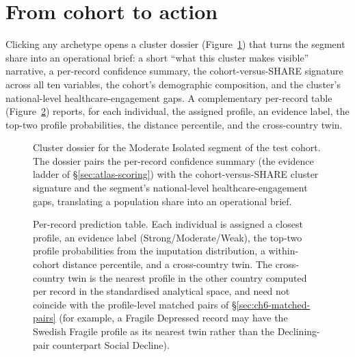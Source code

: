 \section{From cohort to action}
\label{sec:atlas-action}

 Clicking any archetype opens a cluster dossier (Figure~\ref{fig:atlas-drilldown}) that turns the segment share into an operational brief: a short ``what this cluster makes visible'' narrative, a per-record confidence summary, the cohort-versus-SHARE signature across all ten variables, the cohort's demographic composition, and the cluster's national-level healthcare-engagement gaps. A complementary per-record table (Figure~\ref{fig:atlas-perrow}) reports, for each individual, the assigned profile, an evidence label, the top-two profile probabilities, the distance percentile, and the cross-country twin.

\begin{figure}[H]
  \centering
  \caption[Italian Silver Atlas, cluster dossier]{Cluster dossier for the Moderate Isolated segment of the test cohort. The dossier pairs the per-record confidence summary (the evidence ladder of \S\ref{sec:atlas-scoring}) with the cohort-versus-SHARE cluster signature and the segment's national-level healthcare-engagement gaps, translating a population share into an operational brief.}
  \label{fig:atlas-drilldown}
\end{figure}

\begin{figure}[H]
  \centering
  \caption[Italian Silver Atlas, per-record prediction]{Per-record prediction table. Each individual is assigned a closest profile, an evidence label (Strong/Moderate/Weak), the top-two profile probabilities from the imputation distribution, a within-cohort distance percentile, and a cross-country twin. The cross-country twin is the nearest profile in the other country computed per record in the standardised analytical space, and need not coincide with the profile-level matched pairs of \S\ref{sec:ch6-matched-pairs} (for example, a Fragile Depressed record may have the Swedish Fragile profile as its nearest twin rather than the Declining-pair counterpart Social Decline).}
  \label{fig:atlas-perrow}
\end{figure}

